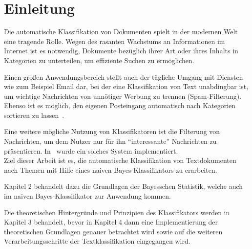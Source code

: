 \section{Einleitung}
    Die automatische Klassifikation von Dokumenten spielt in der modernen Welt eine tragende Rolle. 
    Wegen des rasanten Wachstums an Informationen im Internet ist es notwendig, Dokumente bezüglich ihrer Art oder ihres Inhalts in Kategorien zu unterteilen, um effiziente Suchen zu ermöglichen. 

    Einen großen Anwendungsbereich stellt auch der tägliche Umgang mit Diensten wie zum Beispiel Email dar, bei der eine Klassifikation von Text unabdingbar ist, um wichtige Nachrichten von unnötiger Werbung zu trennen (Spam-Filterung).
    Ebenso ist es möglich, den eigenen Posteingang automatisch nach Kategorien sortieren zu lassen~\cite{IIR}.

    Eine weitere mögliche Nutzung von Klassifikatoren ist die Filterung von Nachrichten, um dem Nutzer nur für ihn ``interessante'' Nachrichten zu präsentieren. 
    In~\cite{PersoNews} wurde ein solches System implementiert.\\

    Ziel dieser Arbeit ist es, die automatische Klassifikation von Textdokumenten nach Themen mit Hilfe eines naiven Bayes-Klassifikators zu erarbeiten.

    Kapitel 2 behandelt dazu die Grundlagen der Bayesschen Statistik, welche auch im naiven Bayes-Klassifikator zur Anwendung kommen. 

    Die theoretischen Hintergründe und Prinzipien des Klassifikators werden in Kapitel 3 behandelt, bevor in Kapitel 4 dann eine Implementierung der theoretischen Grundlagen genauer betrachtet wird sowie auf die weiteren Verarbeitungsschritte der Textklassifikation eingegangen wird.
